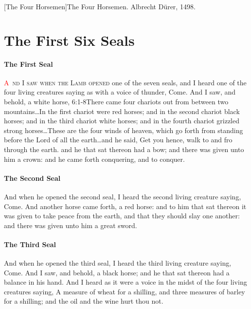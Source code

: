 [The Four Horsemen]{The Four Horsemen. Albrecht Dürer, 1498.}

\chapter{The First Six Seals}
\fancyhead{} %
\subsubsection*{The First Seal}
\lettrine[lines=3]{\textcolor{red}{A}}{\ nd I saw when the Lamb opened} one of the seven seals, and I heard one of the four living creatures saying as with a voice of thunder, Come. 
And I saw, and behold, a white horse,%
					{6:1-8}{There came four chariots out from between two mountains\ldots In the first chariot were red horses; and in the second chariot black horses; and in the third chariot white horses; and in the fourth chariot grizzled strong horses\ldots These are the four winds of heaven, which go forth from standing before the Lord of all the earth\ldots and he said, Get you hence, walk to and fro through the earth.} %
and he that sat thereon had a bow; and there was given unto him a crown: and he came forth conquering, and to conquer.
\subsubsection*{The Second Seal}
And when he opened the second seal, I heard the second living creature saying, Come. %
And another horse came forth, a red horse: and to him that sat thereon it was given to take peace from the earth, and that they should slay one another: and there was given unto him a great sword.
\subsubsection*{The Third Seal}
And when he opened the third seal, I heard the third living creature saying, Come. And I saw, and behold, a black horse; and he that sat thereon had a balance in his hand. %
 And I heard as it were a voice in the midst of the four living creatures saying, A measure of wheat for a shilling, and three measures of barley for a shilling; and the oil and the wine hurt thou not.
